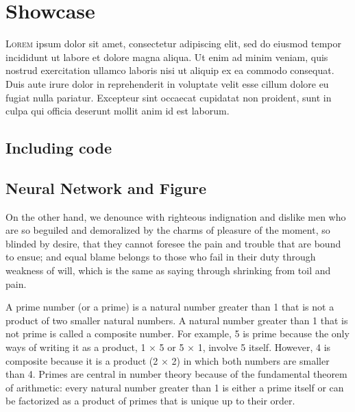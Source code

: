 

\chapter{Showcase}



\lettrine{L}{orem} ipsum dolor sit amet, consectetur adipiscing elit, sed do
eiusmod tempor incididunt ut labore et dolore magna aliqua. Ut enim ad minim
veniam, quis nostrud exercitation ullamco laboris nisi ut aliquip ex ea commodo
consequat. Duis aute irure dolor in reprehenderit in voluptate velit esse cillum
dolore eu fugiat nulla pariatur. Excepteur sint occaecat cupidatat non proident,
sunt in culpa qui officia deserunt mollit anim id est laborum.


\section{Including code}



\section{Neural Network and Figure}

On the other hand, we denounce with righteous indignation and dislike men who
are so beguiled and demoralized by the charms of pleasure of the moment, so
blinded by desire, that they cannot foresee the pain and trouble that are bound
to ensue; and equal blame belongs to those who fail in their duty through
weakness of will, which is the same as saying through shrinking from toil and
pain.

A prime number (or a prime) is a natural number greater than 1 that is not a
product of two smaller natural numbers. A natural number greater than 1 that is
not prime is called a composite number. For example, 5 is prime because the only
ways of writing it as a product, 1 × 5 or 5 × 1, involve 5 itself. However, 4 is
composite because it is a product (2 × 2) in which both numbers are smaller than
4. Primes are central in number theory because of the fundamental theorem of
arithmetic: every natural number greater than 1 is either a prime itself or can
be factorized as a product of primes that is unique up to their order.

